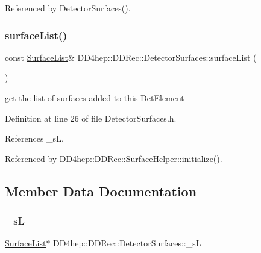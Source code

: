 Referenced by Detector\+Surfaces().

\hypertarget{class_d_d4hep_1_1_d_d_rec_1_1_detector_surfaces_a61d2f33c2a7e0ade6737de05e7e795f1}{}\label{class_d_d4hep_1_1_d_d_rec_1_1_detector_surfaces_a61d2f33c2a7e0ade6737de05e7e795f1} 
\subsubsection{\texorpdfstring{surface\+List()}{surfaceList()}}
{\footnotesize\ttfamily const \hyperlink{class_d_d4hep_1_1_d_d_rec_1_1_surface_list}{Surface\+List}\& D\+D4hep\+::\+D\+D\+Rec\+::\+Detector\+Surfaces\+::surface\+List (\begin{DoxyParamCaption}{ }\end{DoxyParamCaption})\hspace{0.3cm}{\ttfamily [inline]}}



get the list of surfaces added to this Det\+Element 



Definition at line 26 of file Detector\+Surfaces.\+h.



References \+\_\+sL.



Referenced by D\+D4hep\+::\+D\+D\+Rec\+::\+Surface\+Helper\+::initialize().



\subsection{Member Data Documentation}
\hypertarget{class_d_d4hep_1_1_d_d_rec_1_1_detector_surfaces_ae6635879dddb6bd5dd2624c2e38f46a8}{}\label{class_d_d4hep_1_1_d_d_rec_1_1_detector_surfaces_ae6635879dddb6bd5dd2624c2e38f46a8} 
\subsubsection{\texorpdfstring{\+\_\+sL}{\_sL}}
{\footnotesize\ttfamily \hyperlink{class_d_d4hep_1_1_d_d_rec_1_1_surface_list}{Surface\+List}$\ast$ D\+D4hep\+::\+D\+D\+Rec\+::\+Detector\+Surfaces\+::\+\_\+sL\hspace{0.3cm}{\ttfamily [protected]}}



